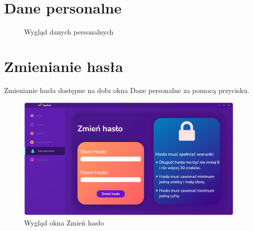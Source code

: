 \section{Dane personalne}

\begin{figure}[H]
    \centering
\caption{Wygląd danych personalnych}
\end{figure}

\section{Zmienianie hasła}

Zmienianie hasła dostępne na dołu okna Dane personalne za pomocą przycisku.

\begin{figure}[H]
\begin{center}
    \includegraphics[height=6cm]{images/zmien_hasl.png}
    \caption{Wygląd okna \textquotedbl Zmień hasło\textquotedbl{}}
\end{center}
\end{figure}

